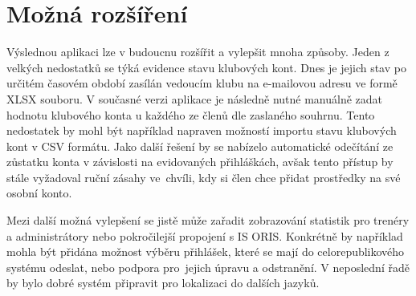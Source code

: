 \section{Možná rozšíření}

Výslednou aplikaci lze v budoucnu rozšířit a vylepšit mnoha způsoby. Jeden z velkých nedostatků se týká evidence stavu klubových kont. Dnes je jejich stav po určitém časovém období zasílán vedoucím klubu na e-mailovou adresu ve formě XLSX souboru. V současné verzi aplikace je následně nutné manuálně zadat hodnotu klubového konta u každého ze členů dle zaslaného souhrnu. Tento nedostatek by mohl být například napraven možností importu stavu klubových kont v CSV formátu. Jako další řešení by se nabízelo automatické odečítání ze zůstatku konta v závislosti na evidovaných přihláškách, avšak tento přístup by stále vyžadoval ruční zásahy ve~chvíli, kdy si člen chce přidat prostředky na své osobní konto.

Mezi další možná vylepšení se jistě může zařadit zobrazování statistik pro trenéry a administrátory nebo pokročilejší propojení s IS ORIS. Konkrétně by například mohla být přidána možnost výběru přihlášek, které se mají do celorepublikového systému odeslat, nebo podpora pro~jejich úpravu a odstranění. V neposlední řadě by bylo dobré systém připravit pro lokalizaci do dalších jazyků.
